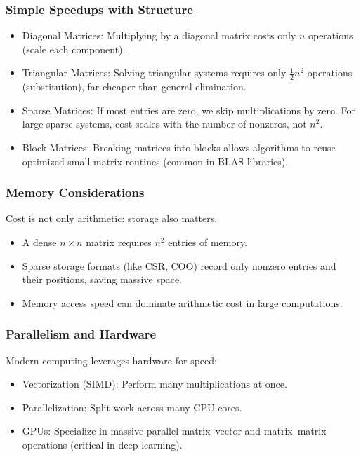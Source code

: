 \documentclass[
  letterpaper,
  DIV=11,
  numbers=noendperiod]{scrreprt}
\providecommand{\tightlist}{%
  \setlength{\itemsep}{0pt}\setlength{\parskip}{0pt}}
\begin{document}
\subsubsection{Simple Speedups with
Structure}\label{simple-speedups-with-structure}

\begin{itemize}
\tightlist
\item
  Diagonal Matrices: Multiplying by a diagonal matrix costs only \(n\)
  operations (scale each component).
\item
  Triangular Matrices: Solving triangular systems requires only
  \(\tfrac{1}{2}n^2\) operations (substitution), far cheaper than
  general elimination.
\item
  Sparse Matrices: If most entries are zero, we skip multiplications by
  zero. For large sparse systems, cost scales with the number of
  nonzeros, not \(n^2\).
\item
  Block Matrices: Breaking matrices into blocks allows algorithms to
  reuse optimized small-matrix routines (common in BLAS libraries).
\end{itemize}

\subsubsection{Memory Considerations}\label{memory-considerations}

Cost is not only arithmetic: storage also matters.

\begin{itemize}
\tightlist
\item
  A dense \(n \times n\) matrix requires \(n^2\) entries of memory.
\item
  Sparse storage formats (like CSR, COO) record only nonzero entries and
  their positions, saving massive space.
\item
  Memory access speed can dominate arithmetic cost in large
  computations.
\end{itemize}

\subsubsection{Parallelism and Hardware}\label{parallelism-and-hardware}

Modern computing leverages hardware for speed:

\begin{itemize}
\tightlist
\item
  Vectorization (SIMD): Perform many multiplications at once.
\item
  Parallelization: Split work across many CPU cores.
\item
  GPUs: Specialize in massive parallel matrix--vector and matrix--matrix
  operations (critical in deep learning).
\end{itemize}
\end{document}

